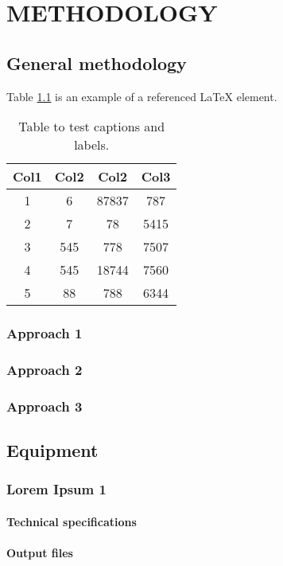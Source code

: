 \chapter{METHODOLOGY}
\minitoc 

\section{General methodology}

Table \ref{table:1} is an example of a referenced \LaTeX{} element.

\begin{table}[h!]
\centering
\begin{tabular}{||c c c c||} 
 \hline
 Col1 & Col2 & Col2 & Col3 \\ [0.5ex] 
 \hline\hline
 1 & 6 & 87837 & 787 \\ 
 2 & 7 & 78 & 5415 \\
 3 & 545 & 778 & 7507 \\
 4 & 545 & 18744 & 7560 \\
 5 & 88 & 788 & 6344 \\ [1ex] 
 \hline
\end{tabular}
\caption{Table to test captions and labels.}
\label{table:1}
\end{table}

\subsection{Approach 1}
\subsection{Approach 2}
\subsection{Approach 3}
\section{Equipment}
\subsection{Lorem Ipsum 1}
\subsubsection{Technical specifications}
\subsubsection{Output files}
